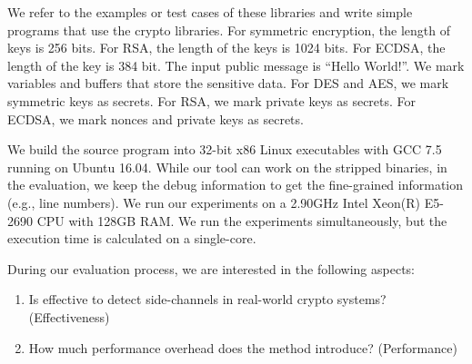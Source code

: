 We refer to the examples or test cases of these libraries and write simple
programs that use the crypto libraries. For symmetric encryption, the length
of keys is 256 bits. For RSA, the length of the keys is 1024 bits. For ECDSA, the
length of the key is 384 bit. The input public message is ``Hello World!''.
We mark variables and buffers that store the sensitive data.
For DES and AES, we mark symmetric keys as secrets.
For RSA, we mark private keys as secrets. For ECDSA,
we mark nonces and private keys as secrets.

We build the source program into 32-bit x86 Linux executables with GCC 7.5
running on Ubuntu 16.04. While our tool can work on the stripped binaries, 
in the evaluation, we keep the debug information to get the fine-grained information
(e.g., line numbers).
We run our experiments on a 2.90GHz Intel Xeon(R) E5-2690 CPU with 128GB
RAM. We run the experiments simultaneously, but the execution time is calculated on a single-core.

During our evaluation process, we are interested in the following
aspects:
\begin{enumerate}
    \item Is \detect{} effective to detect side-channels in real-world crypto systems? (Effectiveness)
    \item How much performance overhead does the method introduce? (Performance)
\end{enumerate}

